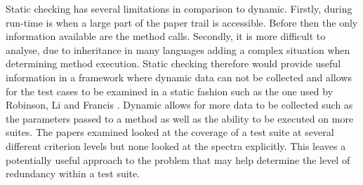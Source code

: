 Static checking has several limitations in comparison to dynamic. Firstly, during run-time is when a large part of the paper trail is accessible. Before then the only information available are the method calls. Secondly, it is more difficult to analyse, due to inheritance in many languages adding a complex situation when determining method execution. Static checking therefore would provide useful information in a framework where dynamic data can not be collected and allows for the test cases to be examined in a static fashion such as the one used by Robinson, Li and Francis \cite{li2008static}. Dynamic allows for more data to be collected such as the parameters passed to a method as well as the ability to be executed on more suites. The papers examined looked at the coverage of a test suite at several different criterion levels but none looked at the spectra explicitly. This leaves a potentially useful approach to the problem that may help determine the level of redundancy within a test suite. 